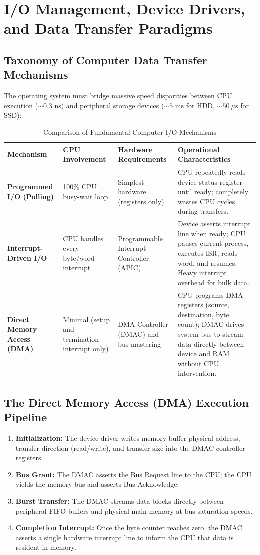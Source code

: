 \section{I/O Management, Device Drivers, and Data Transfer Paradigms}
\label{sec:os_io_management}

\subsection{Taxonomy of Computer Data Transfer Mechanisms}
The operating system must bridge massive speed disparities between CPU execution ($\sim 0.3\text{ ns}$) and peripheral storage devices ($\sim 5\text{ ms}$ for HDD, $\sim 50\ \mu\text{s}$ for SSD):
\begin{table}[htbp]
\centering
\small
\caption{Comparison of Fundamental Computer I/O Mechanisms}
\label{tab:io_mechanisms_comparison}
\begin{tabularx}{\textwidth}{l p{3.2cm} p{3.5cm} X}
\toprule
\textbf{Mechanism} & \textbf{CPU Involvement} & \textbf{Hardware Requirements} & \textbf{Operational Characteristics} \\
\midrule
\textbf{Programmed I/O (Polling)} & 100\% CPU busy-wait loop & Simplest hardware (registers only) & CPU repeatedly reads device status register until ready; completely wastes CPU cycles during transfers. \\
\textbf{Interrupt-Driven I/O} & CPU handles every byte/word interrupt & Programmable Interrupt Controller (APIC) & Device asserts interrupt line when ready; CPU pauses current process, executes ISR, reads word, and resumes. Heavy interrupt overhead for bulk data. \\
\textbf{Direct Memory Access (DMA)} & Minimal (setup and termination interrupt only) & DMA Controller (DMAC) and bus mastering & CPU programs DMA registers (source, destination, byte count); DMAC drives system bus to stream data directly between device and RAM without CPU intervention. \\
\bottomrule
\end{tabularx}
\end{table}

\subsection{The Direct Memory Access (DMA) Execution Pipeline}
\begin{enumerate}
    \item \textbf{Initialization:} The device driver writes memory buffer physical address, transfer direction (read/write), and transfer size into the DMAC controller registers.
    \item \textbf{Bus Grant:} The DMAC asserts the Bus Request line to the CPU; the CPU yields the memory bus and asserts Bus Acknowledge.
    \item \textbf{Burst Transfer:} The DMAC streams data blocks directly between peripheral FIFO buffers and physical main memory at bus-saturation speeds.
    \item \textbf{Completion Interrupt:} Once the byte counter reaches zero, the DMAC asserts a single hardware interrupt line to inform the CPU that data is resident in memory.
\end{enumerate}

